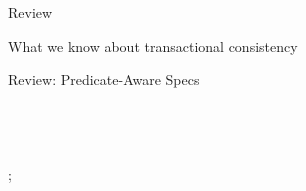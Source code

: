 
\begin{frame}{Review}
  \begin{center}
    {\LARGE What we know about transactional consistency}\\[1em]
    {\LARGE{}}
  \end{center}
\end{frame}


\begin{frame}{Review: Predicate-Aware Specs}
  \begin{columns}[c,onlytextwidth]
      \begin{center}
         \\[1em]
      \end{center}
      \begin{center}
      \end{center}
  \end{columns}
  \vfill
  \begin{center}
    \large{};
  \end{center}
\end{frame}

